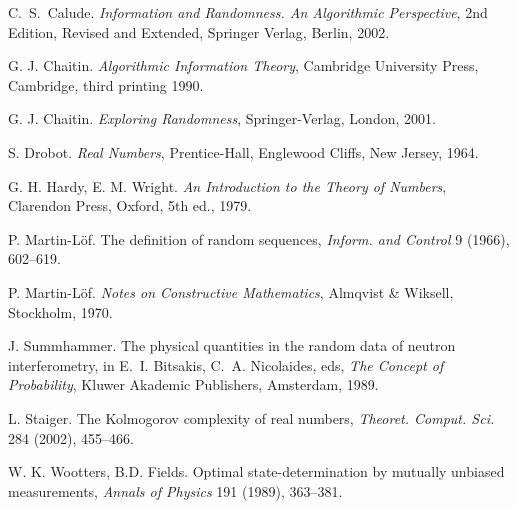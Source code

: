 \documentclass[11pt,a4paper,twoside]{article}
\begin{document}
\begin{thebibliography}{99}%
 C.~S.~Calude. \textsl{Information and Randomness. An
Algorithmic
    Perspective}, 2nd Edition, Revised and Extended, Springer Verlag,
Berlin,
  2002.
  
G. J. Chaitin. {\em Algorithmic Information Theory},
Cambridge University Press, Cambridge,  third printing 1990.

  G. J. Chaitin. {\em Exploring
Randomness}, Springer-Verlag,
London, 2001.

 S. Drobot. {\em Real Numbers}, Prentice-Hall, Englewood
Cliffs, New Jersey, 1964.

G. H. Hardy, E. M. Wright. {\em An
Introduction to the Theory of
Numbers}, Clarendon Press, Oxford, 5th ed., 1979.

 P. Martin-L\"{o}f. The definition of random sequences,
  \textsl{Inform.  and Control} 9 (1966), 602--619.
  
 P. Martin-L\"{o}f. \textsl{Notes on Constructive
Mathematics},
  Almqvist \& Wiksell, Stockholm, 1970.

J. Summhammer.
 The physical quantities in the random data of neutron interferometry,
in E.~I. Bitsakis,  C.~A. Nicolaides, eds, {\em The Concept of
  Probability},  Kluwer Akademic Publishers, Amsterdam, 1989.


  L. Staiger. The Kolmogorov complexity of real numbers,
 {\em Theoret. Comput. Sci.} 284 (2002), 455--466.

W. K. Wootters,  B.D. Fields.
Optimal state-determination by mutually unbiased measurements,
 {\em Annals of Physics} 191 (1989), 363--381.



\end{thebibliography}


%
%
%
\end{document}

